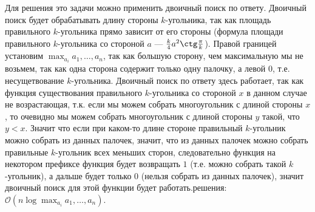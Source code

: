 \documentclass[a4paper,12pt]{article}
\begin{document}
\par Для решения это задачи можно применить двоичный поиск по ответу. Двоичный поиск будет обрабатывать длину стороны $k$-угольника, так как площадь правильного $k$-угольника прямо зависит от его стороны (формула площади правильного $k$-угольника со стороной $a$ --- $\frac{k}{4}a^2\ctg \frac{\pi}{k}$). Правой границей установим $\max_{a_i} {a_1, \ldots, a_n}$, так как большую сторону, чем максимальную мы не возьмем, так как одна сторона содержит только одну палочку, а левой $0$, т.е. несущетвование $k$-угольника. Двоичный поиск по ответу здесь работает, так как функция существования правильного $k$-угольника со стороной $x$ в данном случае не возрастающая, т.к. если мы можем собрать многоугольник с длиной стороны $x$, то очевидно мы можем собрать многоугольник с длиной стороны $y$ такой, что $y < x$. Значит что если при каком-то длине стороне правильный $k$-угольник можно собрать из данных палочек, значит, что из данных палочек можно собрать правильные $k$-угольник всех меньших сторон, следовательно функция на некотором префиксе функция будет возвращать $1$ (т.е. можно собрать такой $k$-угольник), а дальше будет только $0$ (нельзя собрать из данных палочек), значит двоичный поиск для этой функции будет работать. решения: $\mathcal{O}(n \log \max_{a_i} {a_1, \ldots, a_n})$.
\end{document}

